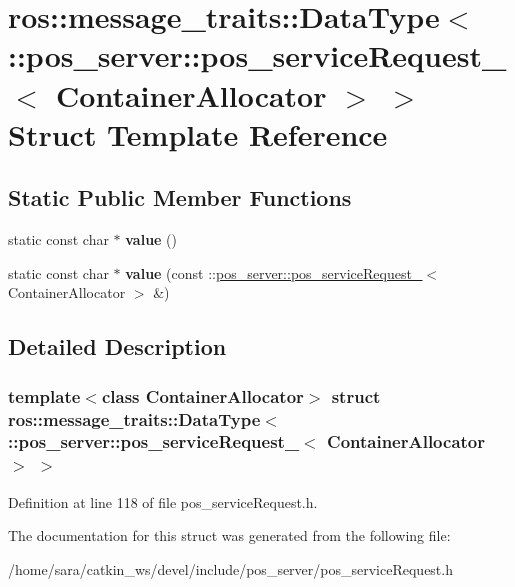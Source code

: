 \hypertarget{structros_1_1message__traits_1_1DataType_3_01_1_1pos__server_1_1pos__serviceRequest___3_01ContainerAllocator_01_4_01_4}{}\section{ros\+:\+:message\+\_\+traits\+:\+:Data\+Type$<$ \+:\+:pos\+\_\+server\+:\+:pos\+\_\+service\+Request\+\_\+$<$ Container\+Allocator $>$ $>$ Struct Template Reference}
\label{structros_1_1message__traits_1_1DataType_3_01_1_1pos__server_1_1pos__serviceRequest___3_01ContainerAllocator_01_4_01_4}
\subsection*{Static Public Member Functions}
\begin{DoxyCompactItemize}
\item 
\mbox{\label{structros_1_1message__traits_1_1DataType_3_01_1_1pos__server_1_1pos__serviceRequest___3_01ContainerAllocator_01_4_01_4_ade59c51e048d63d9f41ac53eec21b5f5}} 
static const char $\ast$ {\bfseries value} ()
\item 
\mbox{\label{structros_1_1message__traits_1_1DataType_3_01_1_1pos__server_1_1pos__serviceRequest___3_01ContainerAllocator_01_4_01_4_a798426fd8ed3208eb96873664108cdae}} 
static const char $\ast$ {\bfseries value} (const \+::\hyperlink{structpos__server_1_1pos__serviceRequest__}{pos\+\_\+server\+::pos\+\_\+service\+Request\+\_\+}$<$ Container\+Allocator $>$ \&)
\end{DoxyCompactItemize}


\subsection{Detailed Description}
\subsubsection*{template$<$class Container\+Allocator$>$\newline
struct ros\+::message\+\_\+traits\+::\+Data\+Type$<$ \+::pos\+\_\+server\+::pos\+\_\+service\+Request\+\_\+$<$ Container\+Allocator $>$ $>$}



Definition at line 118 of file pos\+\_\+service\+Request.\+h.



The documentation for this struct was generated from the following file\+:\begin{DoxyCompactItemize}
\item 
/home/sara/catkin\+\_\+ws/devel/include/pos\+\_\+server/pos\+\_\+service\+Request.\+h\end{DoxyCompactItemize}
